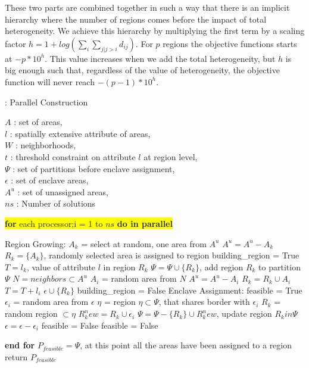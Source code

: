 \documentclass[conference]{IEEEtran}
\begin{document}
These two parts are combined together in such a way that there is an implicit
hierarchy where the number of regions comes before the impact of total
heterogeneity. We achieve this hierarchy by multiplying the first term by a
scaling factor $h = 1 + log(\sum_i \sum_{j|j>i} d_{ij})$. For $p$ regions the
objective functions starts at $−p\ast10^h$. This value increases when we add the
total heterogeneity, but $h$ is big enough such that, regardless of the value of
heterogeneity, the objective function will never reach $-(p-1) \ast 10^h$.

\begin{algorithm}
\renewcommand{\thealgorithm}{}
\scriptsize
\caption{: Parallel Construction~\cite{r1}}
$A$ : set of areas,\\
$l$ : spatially extensive attribute of areas,\\
$W$ : neighborhoods,\\
$t$ : threshold constraint on attribute $l$ at region level,\\
$\Psi$ : set of partitions before enclave assignment,\\
$\epsilon$ : set of enclave areas,\\
$A^u$ : set of unassigned areas,\\
$ns$ : Number of solutions\\
\begin{algorithmic}
\vbox{\colorbox{yellow}{\vbox{\STATE \textbf{for} each processor;i = 1 to $ns$ \textbf{do in parallel}}}} 
\begin{ALC@g}
	\STATE Region Growing:
		\STATE $A_k$ = select at random, one area from $A^u$
		\STATE $A^u = A^u - A_k$
		\STATE $R_k = \{A_k\}$, randomly selected area is assigned to region
		\STATE building\_region = True
		\STATE $T = l_k$, value of attribute $l$ in region $R_k$
				\STATE $\Psi = \Psi \cup \{R_k\}$, add region $R_k$ to partition $\Psi$
			\ELSE
				\STATE $N = neighbors \subset A^u$%
					\STATE $A_i$ = random area from $N$
					\STATE $A^u = A^u - A_i$
					\STATE $R_k = R_k \cup A_i$
					\STATE $T = T + l_i$
				\ELSE
					\STATE $\epsilon \cup \{R_k\}$
					\STATE building\_region = False
				\ENDIF
			\ENDIF
		\ENDWHILE
	\ENDWHILE
	\STATE Enclave Assignment:
		\STATE feasible = True
			\STATE $\epsilon_i$ = random area from $\epsilon$
			\STATE $\eta$ = region $\eta \subset \Psi $, that shares border with $\epsilon_i$
				\STATE $R_k$ = random region $\subset \eta$
				\STATE $R_k^new = R_k \cup \epsilon_i$
				\STATE $\Psi = \Psi - \{R_k\} \cup R_k^new$, update region $R_k in \Psi$
				\STATE $\epsilon = \epsilon - \epsilon_i$
			\ELSE
				\STATE feasible = False
			\ENDIF
		\ENDWHILE
	\ELSE
		\STATE feasible = False
	\ENDIF
\end{ALC@g}
\STATE \textbf{end for}
\STATE $P_{feasible} = \Psi$, at this point all the areas have been assigned to a region
\STATE return $P_{feasible}$
\end{algorithmic}
\end{algorithm}
\end{document}
